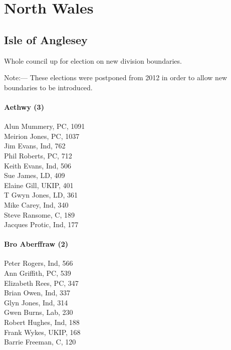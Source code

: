 \documentclass[a4paper,openany,10pt]{book}
\begin{document}
\chapter{North Wales}

\section{Isle of Anglesey}

Whole council up for election on new division boundaries.

Note:— These elections were postponed from 2012 in order to allow new boundaries to be introduced.

\subsubsection*{Aethwy (3)}



Alun Mummery, PC, 1091\\
Meirion Jones, PC, 1037\\
Jim Evans, Ind, 762\\
Phil Roberts, PC, 712\\
Keith Evans, Ind, 506\\
Sue James, LD, 409\\
Elaine Gill, UKIP, 401\\
T Gwyn Jones, LD, 361\\
Mike Carey, Ind, 340\\
Steve Ransome, C, 189\\
Jacques Protic, Ind, 177\\


\subsubsection*{Bro Aberffraw (2)}



Peter Rogers, Ind, 566\\
Ann Griffith, PC, 539\\
Elizabeth Rees, PC, 347\\
Brian Owen, Ind, 337\\
Glyn Jones, Ind, 314\\
Gwen Burns, Lab, 230\\
Robert Hughes, Ind, 188\\
Frank Wykes, UKIP, 168\\
Barrie Freeman, C, 120\\
\end{document}
